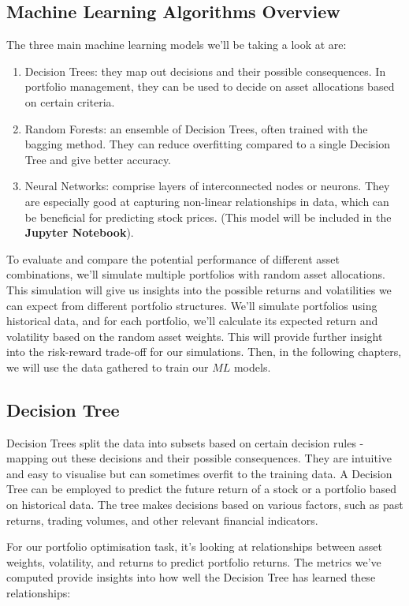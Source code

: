 \documentclass[a4paper,12pt,titlepage]{article}
\numberwithin{equation}{section}
\begin{document}
\subsection{Machine Learning Algorithms Overview}

The three main machine learning models we'll be taking a look at are:

\begin{enumerate}

	\item Decision Trees: they map out decisions and their possible consequences. In portfolio 
		management, they can be used to decide on asset allocations based on certain criteria.
	
	\item Random Forests: an ensemble of Decision Trees, often trained with the bagging method. 
		They can reduce overfitting compared to a single Decision Tree and give better accuracy.
	
	\item Neural Networks: comprise layers of interconnected nodes or neurons. They are especially 
		good at capturing non-linear relationships in data, which can be beneficial for predicting stock 
		prices. (This model will be included in the \textbf{Jupyter Notebook}).

\end{enumerate}

To evaluate and compare the potential performance of different asset combinations, we'll simulate multiple 
portfolios with random asset allocations. This simulation will give us insights into the possible returns 
and volatilities we can expect from different portfolio structures. We'll simulate portfolios using 
historical data, and for each portfolio, we'll calculate its expected return and volatility based on 
the random asset weights. This will provide further insight into the risk-reward trade-off for our 
simulations. Then, in the following chapters, we will use the data gathered to train our $ML$ models.

\subsection{Decision Tree}

Decision Trees split the data into subsets based on certain decision rules - mapping out these decisions 
and their possible consequences. They are intuitive and easy to visualise but can sometimes overfit to the 
training data. A Decision Tree can be employed to predict the future return of a stock or a portfolio based 
on historical data. The tree makes decisions based on various factors, such as past returns, trading volumes, 
and other relevant financial indicators. \newline \par \noindent For our portfolio optimisation task, 
it's looking at relationships between asset weights, volatility, and returns to predict portfolio returns. 
The metrics we've computed provide insights into how well the Decision Tree has learned these relationships:
\end{document}
